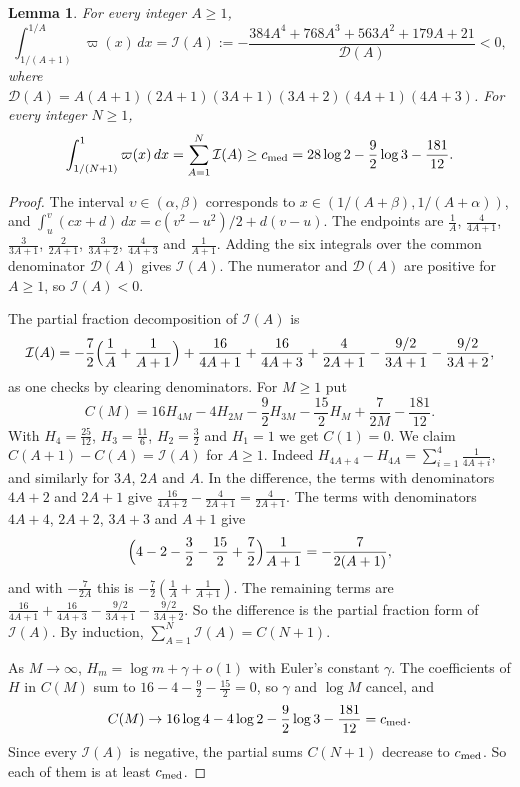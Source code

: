 \documentclass[11pt]{amsart}
\newtheorem{lemma}[theorem]{Lemma}
\theoremstyle{definition}
\theoremstyle{remark}
\numberwithin{equation}{section}
\begin{document}
\begin{lemma}\label{tp:lem:cells}
For every integer $A\ge1$,
\[
 \int_{1/(A+1)}^{1/A}\varpi(x)\,dx=\mathcal I(A):=-\frac{384A^4+768A^3+563A^2+179A+21}{\mathcal D(A)}<0,
\]
where $\mathcal D(A)=A(A+1)(2A+1)(3A+1)(3A+2)(4A+1)(4A+3)$. For every integer $N\ge1$,
\[
 \int_{1/(N+1)}^1\varpi(x)\,dx=\sum_{A=1}^N\mathcal I(A)\ge c_{\rm med}=28\log2-\frac92\log3-\frac{181}{12}.
\]
\end{lemma}

\begin{proof}
The interval $\upsilon\in(\alpha,\beta)$ corresponds to $x\in(1/(A+\beta),1/(A+\alpha))$, and
$\int_u^v(cx+d)\,dx=c(v^2-u^2)/2+d(v-u)$. The endpoints are $\frac1A$, $\frac4{4A+1}$, $\frac3{3A+1}$,
$\frac2{2A+1}$, $\frac3{3A+2}$, $\frac4{4A+3}$ and $\frac1{A+1}$. Adding the six integrals over the common denominator
$\mathcal D(A)$ gives $\mathcal I(A)$. The numerator and $\mathcal D(A)$ are positive for $A\ge1$, so $\mathcal I(A)<0$.

The partial fraction decomposition of $\mathcal I(A)$ is
\[
 \mathcal I(A)=-\frac72\Bigl(\frac1A+\frac1{A+1}\Bigr)+\frac{16}{4A+1}+\frac{16}{4A+3}+\frac4{2A+1}-\frac{9/2}{3A+1}-\frac{9/2}{3A+2},
\]
as one checks by clearing denominators. For $M\ge1$ put
\[
 C(M)=16H_{4M}-4H_{2M}-\frac92H_{3M}-\frac{15}2H_M+\frac7{2M}-\frac{181}{12}.
\]
With $H_4=\frac{25}{12}$, $H_3=\frac{11}6$, $H_2=\frac32$ and $H_1=1$ we get $C(1)=0$. We claim
$C(A+1)-C(A)=\mathcal I(A)$ for $A\ge1$. Indeed $H_{4A+4}-H_{4A}=\sum_{i=1}^4\frac1{4A+i}$, and similarly for
$3A$, $2A$ and $A$. In the difference, the terms with denominators $4A+2$ and $2A+1$ give
$\frac{16}{4A+2}-\frac4{2A+1}=\frac4{2A+1}$. The terms with denominators $4A+4$, $2A+2$, $3A+3$ and $A+1$ give
\[
 \Bigl(4-2-\frac32-\frac{15}2+\frac72\Bigr)\frac1{A+1}=-\frac7{2(A+1)},
\]
and with $-\frac7{2A}$ this is $-\frac72(\frac1A+\frac1{A+1})$. The remaining terms are
$\frac{16}{4A+1}+\frac{16}{4A+3}-\frac{9/2}{3A+1}-\frac{9/2}{3A+2}$. So the difference is the partial fraction form
of $\mathcal I(A)$. By induction,
$\sum_{A=1}^N\mathcal I(A)=C(N+1)$.

As $M\to\infty$, $H_m=\log m+\gamma+o(1)$ with Euler's constant $\gamma$. The coefficients of $H$ in $C(M)$ sum to
$16-4-\frac92-\frac{15}2=0$, so $\gamma$ and $\log M$ cancel, and
\[
 C(M)\to16\log4-4\log2-\frac92\log3-\frac{181}{12}=c_{\rm med}.
\]
Since every $\mathcal I(A)$ is negative, the partial sums $C(N+1)$ decrease to $c_{\rm med}$. So each of them is at
least $c_{\rm med}$.
\end{proof}
\end{document}
